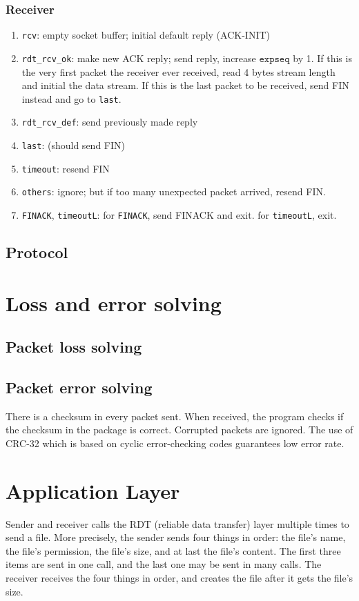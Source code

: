 \documentclass[10pt,a4paper]{article}
\begin{document}
    \subsubsection{Receiver}
    \begin{enumerate}
        \item \texttt{rcv}: empty socket buffer; initial default reply (ACK-INIT)
        \item \texttt{rdt\_rcv\_ok}: make new ACK reply; send reply, increase $\texttt{expseq}$ by 1. If this is the very first packet the receiver ever received, read 4 bytes stream length and initial the data stream. If this is the last packet to be received, send FIN instead and go to \texttt{last}.
        \item \texttt{rdt\_rcv\_def}: send previously made reply
        \item \texttt{last}: (should send FIN)
        \item \texttt{timeout}: resend FIN
        \item \texttt{others}: ignore; but if too many unexpected packet arrived, resend FIN.
        \item \texttt{FINACK}, \texttt{timeoutL}: for \texttt{FINACK}, send FINACK and exit. for \texttt{timeoutL}, exit.
    \end{enumerate}
\subsection{Protocol}
\section{Loss and error solving}
    \subsection{Packet loss solving}
        
    \subsection{Packet error solving}
        There is a checksum in every packet sent. When received, the program checks if the checksum in the package is correct. Corrupted packets are ignored. The use of CRC-32 which is based on cyclic error-checking codes guarantees low error rate.

\section{Application Layer}
    Sender and receiver calls the RDT (reliable data transfer) layer multiple times to send a file. More precisely, the sender sends four things in order: the file's name, the file's permission, the file's size, and at last the file's content. The first three items are sent in one call, and the last one may be sent in many calls. The receiver receives the four things in order, and creates the file after it gets the file's size.
\end{document}
